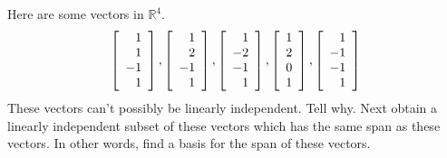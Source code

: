 \begin{enumialphparenastyle}
\begin{ex} Here are some vectors in $\mathbb{R}^{4}$. 
\begin{equation*}
\left[ 
\begin{array}{r}
1 \\ 
1 \\ 
-1 \\ 
1
\end{array}
\right] ,\left[ 
\begin{array}{r}
1 \\ 
2 \\ 
-1 \\ 
1
\end{array}
\right] ,\left[ 
\begin{array}{r}
1 \\ 
-2 \\ 
-1 \\ 
1
\end{array}
\right] ,\left[ 
\begin{array}{r}
1 \\ 
2 \\ 
0 \\ 
1
\end{array}
\right] ,\left[ 
\begin{array}{r}
1 \\ 
-1 \\ 
-1 \\ 
1
\end{array}
\right]
\end{equation*}
These vectors can't possibly be linearly independent. Tell why. Next obtain a
linearly independent subset of these vectors which has the same span as
these vectors. In other words, find a basis for the span of these vectors.
\end{ex}


\end{enumialphparenastyle}
